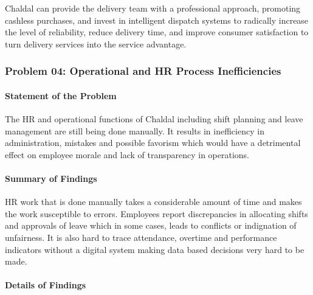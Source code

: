 \documentclass[12pt,a4paper]{article}
\begin{document}
Chaldal can provide the delivery team with a professional approach, promoting cashless purchases, and invest in intelligent dispatch systems to radically increase the level of reliability, reduce delivery time, and improve consumer satisfaction to turn delivery services into the service advantage.

\subsubsection{Problem 04: Operational and HR Process Inefficiencies}

\paragraph{Statement of the Problem}

The HR and operational functions of Chaldal including shift planning and leave management are still being done manually. It results in inefficiency in administration, mistakes and possible favorism which would have a detrimental effect on employee morale and lack of transparency in operations.

\paragraph{Summary of Findings}

HR work that is done manually takes a considerable amount of time and makes the work susceptible to errors. Employees report discrepancies in allocating shifts and approvals of leave which in some cases, leads to conflicts or indignation of unfairness. It is also hard to trace attendance, overtime and performance indicators without a digital system making data based decisions very hard to be made.

\paragraph{Details of Findings}
\end{document}
